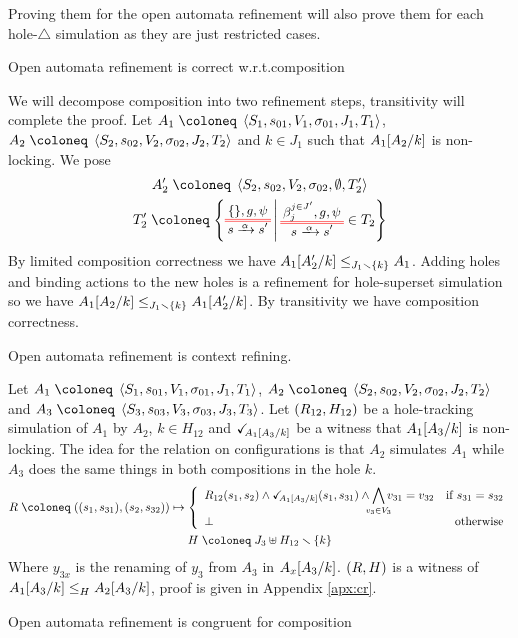 \documentclass{article}
\begin{document}
Proving them for the open automata refinement will also prove them for each hole-\(\triangle\) simulation as they are just restricted cases.
\begin{thm} Open automata refinement is correct w.r.t.\@ composition \end{thm}
We will decompose composition into two refinement steps, transitivity will complete the proof.
Let \(A_1 \defobject \OAg[1]\), \(A_2 \defobject \OAg[2]\) and \(k \in J_1\) such that \(A_1\subst{A_2}{k}\) is non-locking.
We pose
\begin{gather*}
	A'_2 \defobject \OA{S_2}{s_{02}}{V_2}{\sigma_{02}}{\emptyset}{T'_2} \\
	T'_2 \defobject \mset{\OT{s}{s'}{\alpha}{\mbrc{}}{g}{\psi}}{\OTg \in T_2}
\end{gather*}
By limited composition correctness we have \(\wrel{A_1\subst{A'_2}{k}}{A_1}{J_1 \setminus \mbrc{k}}\).
Adding holes and binding actions to the new holes is a refinement for hole-superset simulation so we have \(\wrel{A_1\subst{A_2}{k}}{A_1\subst{A'_2}{k}}{J_1 \setminus \mbrc{k}}\).
By transitivity we have composition correctness.
\begin{thm} Open automata refinement is context refining. \end{thm}
Let \(A_1 \defobject \OAg[1]\), \(A_2 \defobject \OAg[2]\) and \(A_3 \defobject \OAg[3]\).
Let \(\mpar{R_{12}, H_{12}}\) be a hole-tracking simulation of \(A_1\) by \(A_2\), \(k \in H_{12}\) and \(\reach{A_1\subst{A_3}{k}}\) be a witness that \(A_1\subst{A_3}{k}\) is non-locking.
The idea for the relation on configurations is that \(A_2\) simulates \(A_1\) while \(A_3\) does the same things in both compositions in the hole \(k\).
\begin{gather*}
	R \defobject \mpar{\mpar{s_1, s_{31}}, \mpar{s_2, s_{32}}} \mapsto \choice{R_{12}\mpar{s_1, s_2} \wedge \reach{A_1\subst{A_3}{k}}\mpar{s_1, s_{31}} \wedge \bigwedge_\subbox{v_3 \in V_3} v_{31} = v_{32} & \text{if } s_{31} = s_{32} \\ \bot & \text{otherwise}} \\
	H \defobject J_3 \uplus H_{12} \setminus \mbrc{k}
\end{gather*}
Where \(y_{3x}\) is the renaming of \(y_3\) from \(A_3\) in \(A_x\subst{A_3}{k}\).
\(\mpar{R, H}\) is a witness of \(\wrel{A_1\subst{A_3}{k}}{A_2\subst{A_3}{k}}{H}\), proof is given in Appendix \ref{apx:cr}.
\begin{thm} Open automata refinement is congruent for composition \end{thm}
\end{document}
